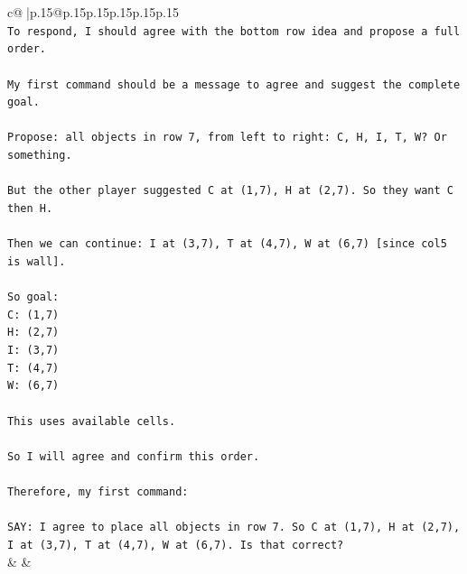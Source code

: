 \documentclass{article}
\begin{document}
{\begin{supertabular}{c@{$\;$}|p{.15\linewidth}@{}p{.15\linewidth}p{.15\linewidth}p{.15\linewidth}p{.15\linewidth}p{.15\linewidth}}
{{{\\ 
\texttt{To respond, I should agree with the bottom row idea and propose a full order.} \\
\\ 
\texttt{My first command should be a message to agree and suggest the complete goal.} \\
\\ 
\texttt{Propose: all objects in row 7, from left to right: C, H, I, T, W? Or something.} \\
\\ 
\texttt{But the other player suggested C at (1,7), H at (2,7). So they want C then H.} \\
\\ 
\texttt{Then we can continue: I at (3,7), T at (4,7), W at (6,7) {[}since col5 is wall{]}.} \\
\\ 
\texttt{So goal:} \\
\texttt{C: (1,7)} \\
\texttt{H: (2,7)} \\
\texttt{I: (3,7)} \\
\texttt{T: (4,7)} \\
\texttt{W: (6,7)} \\
\\ 
\texttt{This uses available cells.} \\
\\ 
\texttt{So I will agree and confirm this order.} \\
\\ 
\texttt{Therefore, my first command:} \\
\\ 
\texttt{SAY: I agree to place all objects in row 7. So C at (1,7), H at (2,7), I at (3,7), T at (4,7), W at (6,7). Is that correct?} \\
            }
        }
    }
    & & \\ \\


\end{supertabular}}
\end{document}
